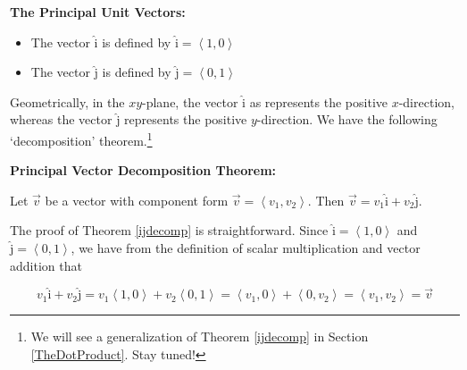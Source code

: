 \documentclass{ximera}
\begin{document}
 


\begin{definition} \label{ihatjhatdefn}  \textbf{The Principal Unit Vectors:} $~$   

\begin{itemize}

\item The vector $\hat{\text{i}}$ is defined by $\hat{\text{i}} = \left<1,0\right>$

\item The vector $\hat{\text{j}}$ is defined by $\hat{\text{j}} = \left<0,1\right>$

\end{itemize}

 

\end{definition}


 

Geometrically, in the $xy$-plane, the vector $\hat{\text{i}}$ as represents the positive $x$-direction, whereas the vector $\hat{\text{j}}$ represents the positive $y$-direction.  We have the following `decomposition' theorem.\footnote{We will see a generalization of Theorem \ref{ijdecomp} in Section \ref{TheDotProduct}.  Stay tuned!}  

 


\begin{theorem} \label{ijdecomp}  \textbf{Principal Vector Decomposition Theorem:} 

 Let $\overrightarrow{v}$ be a vector with component form  $\overrightarrow{v} = \left< v_1 ,v_2\right>$. Then $\overrightarrow{v} = v_1 \hat{\text{i}} + v_2 \hat{\text{j}}$. 


\end{theorem}


 

The proof of Theorem \ref{ijdecomp} is straightforward. Since $\hat{\text{i}} = \left<1,0\right>$ and $\hat{\text{j}} = \left< 0,1\right>$, we have from the definition of scalar multiplication and vector addition that  

\[v_1 \hat{\text{i}} + v_2 \hat{\text{j}} = v_1\left<1,0\right> + v_2\left<0,1\right> = \left<v_1,0\right> + \left<0,v_2\right> = \left<v_1,v_2\right> = \overrightarrow{v}\]
\end{document}
